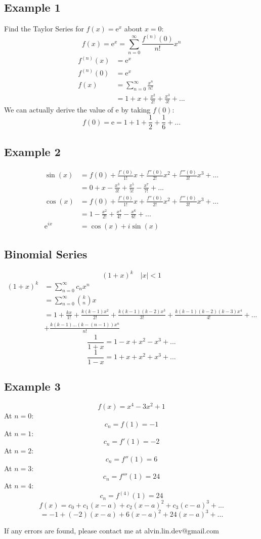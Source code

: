 \documentclass[letterpaper, 12pt]{article}
\newcommand*{\e}{\mathrm{e}}
\begin{document}
\subsection*{Example 1}
Find the Taylor Series for \( f(x)= \e^{x} \) about \( x = 0 \):
\[ f(x) = \e^{x} = \sum_{n=0}^{\infty}\frac{f^{(n)}(0)}{n!}x^{n} \]
\begin{align*}
  f^{(n)}(x) &= \e^{x} \\
  f^{(n)}(0) &= \e^{x} \\
  f(x) &= \sum_{n=0}^{\infty}\frac{x^{n}}{n!} \\
  &= 1+x+\frac{x^{2}}{2!}+\frac{x^{3}}{3!}+...
\end{align*}
We can actually derive the value of \( \e \) by taking \( f(0) \):
\[ f(0) = \e = 1+1+\frac{1}{2}+\frac{1}{6}+... \]

\subsection*{Example 2}
\begin{align*}
  \sin(x) &= f(0)+\frac{f'(0)}{1!}x+\frac{f''(0)}{2!}x^{2}+
    \frac{f'''(0)}{3!}x^{3}+... \\
  &= 0+x-\frac{x^{3}}{3!}+\frac{x^{5}}{5!}-\frac{x^{7}}{7!}+... \\
  \cos(x) &= f(0)+\frac{f'(0)}{1!}x+\frac{f''(0)}{2!}x^{2}+
    \frac{f'''(0)}{3!}x^{3}+... \\
  &= 1-\frac{x^{2}}{2!}+\frac{x^{4}}{4!}-\frac{x^{6}}{6!}+... \\
  \e^{ix} &= \cos(x)+i\sin(x)
\end{align*}

\subsection*{Binomial Series}
\[ (1+x)^{k} \quad |x| < 1 \]
\begin{align*}
  (1+x)^{k} &= \sum_{n=0}^{\infty}c_{n}x^{n} \\
  &= \sum_{n=0}^{\infty}\binom{k}{n}x \\
  &= 1+\frac{kx}{1!}+\frac{k(k-1)x^{2}}{2!}+\frac{k(k-1)(k-2)x^{3}}{3!}+
    \frac{k(k-1)(k-2)(k-3)x^{4}}{4!}+... \\
  & +\frac{k(k-1)...(k-(n-1))x^{n}}{n!}
\end{align*}
\[ \frac{1}{1+x} = 1-x+x^{2}-x^{3}+... \]
\[ \frac{1}{1-x} = 1+x+x^{2}+x^{3}+... \]

\subsection*{Example 3}
\[ f(x) = x^{4}-3x^{2}+1 \]
At \( n = 0 \):
\[ c_{n} = f(1) = -1 \]
At \( n = 1 \):
\[ c_{n} = f'(1) = -2 \]
At \( n = 2 \):
\[ c_{n} = f''(1) = 6 \]
At \( n = 3 \):
\[ c_{n} = f'''(1) = 24 \]
At \( n = 4 \):
\[ c_{n} = f^{(4)}(1) = 24 \]
\[ f(x) = c_{0}+c_{1}(x-a)+c_{2}(x-a)^{2}+c_{3}(c-a)^{3}+... \]
\[ = -1+(-2)(x-a)+6(x-a)^{2}+24(x-a)^{3}+... \]

\begin{center}
  If any errors are found, please contact me at alvin.lin.dev@gmail.com
\end{center}
\end{document}
